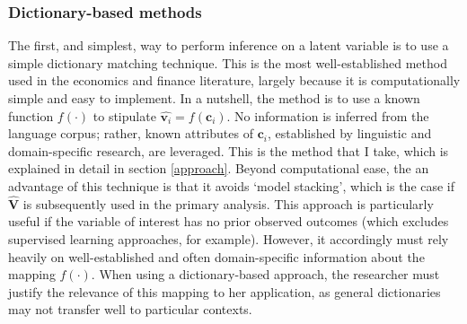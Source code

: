 \documentclass{article}
\begin{document}
\subsubsection{Dictionary-based methods}
The first, and simplest, way to perform inference on a latent variable is to use a simple dictionary matching technique. This is the most well-established method used in the economics and finance literature, largely because it is computationally simple and easy to implement. In a nutshell, the method is to use a known function \(f(\cdot)\) to stipulate \(\hat{\mathbf{v}_i} = f(\mathbf{c}_i)\). No information is inferred from the language corpus; rather, known attributes of \(\mathbf{c}_i\), established by linguistic and domain-specific research, are leveraged. This is the method that I take, which is explained in detail in section \ref{approach}. Beyond computational ease, the an advantage of this technique is that it avoids `model stacking', which is the case if \(\hat{\mathbf{V}}\) is subsequently used in the primary analysis. This approach is particularly useful if the variable of interest has no prior observed outcomes (which excludes supervised learning approaches, for example). However, it accordingly must rely heavily on well-established and often domain-specific information about the mapping \(f(\cdot  )\). When using a dictionary-based approach, the researcher must justify the relevance of this mapping to her application, as general dictionaries may not transfer well to particular contexts. 
\end{document}
